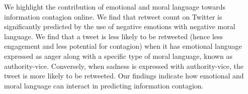 We highlight the contribution of emotional and moral language towards information contagion online. We find that retweet count on Twitter is significantly predicted by the use of negative emotions with negative moral language. We find that a tweet is less likely to be retweeted (hence less engagement and less potential for contagion) when it has emotional language expressed as anger along with a specific type of moral language, known as authority-vice. Conversely, when sadness is expressed with authority-vice, the tweet is more likely to be retweeted. Our findings indicate how emotional and moral language can interact in predicting information contagion.
